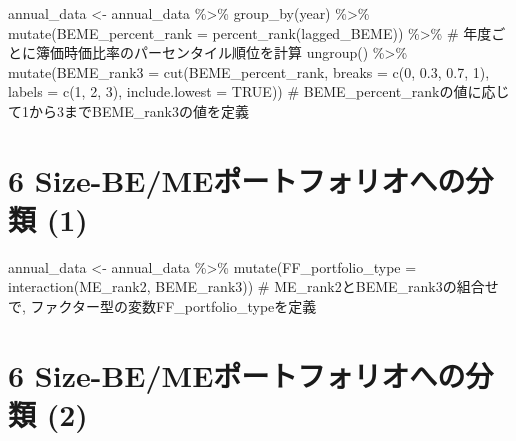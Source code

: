 \documentclass[
  letterpaper,
  DIV=11,
  numbers=noendperiod]{scrreprt}
\newenvironment{Shaded}{\begin{snugshade}}{\end{snugshade}}
\newcommand{\AttributeTok}[1]{\textcolor[rgb]{0.40,0.45,0.13}{#1}}
\newcommand{\CommentTok}[1]{\textcolor[rgb]{0.37,0.37,0.37}{#1}}
\newcommand{\ConstantTok}[1]{\textcolor[rgb]{0.56,0.35,0.01}{#1}}
\newcommand{\DecValTok}[1]{\textcolor[rgb]{0.68,0.00,0.00}{#1}}
\newcommand{\FloatTok}[1]{\textcolor[rgb]{0.68,0.00,0.00}{#1}}
\newcommand{\FunctionTok}[1]{\textcolor[rgb]{0.28,0.35,0.67}{#1}}
\newcommand{\NormalTok}[1]{\textcolor[rgb]{0.00,0.23,0.31}{#1}}
\newcommand{\OtherTok}[1]{\textcolor[rgb]{0.00,0.23,0.31}{#1}}
\newcommand{\SpecialCharTok}[1]{\textcolor[rgb]{0.37,0.37,0.37}{#1}}
\begin{document}
\begin{Shaded}
\begin{Highlighting}[]
\NormalTok{annual\_data }\OtherTok{\textless{}{-}}\NormalTok{ annual\_data }\SpecialCharTok{\%\textgreater{}\%}
  \FunctionTok{group\_by}\NormalTok{(year) }\SpecialCharTok{\%\textgreater{}\%} 
  \FunctionTok{mutate}\NormalTok{(}\AttributeTok{BEME\_percent\_rank =} \FunctionTok{percent\_rank}\NormalTok{(lagged\_BEME)) }\SpecialCharTok{\%\textgreater{}\%} \CommentTok{\# 年度ごとに簿価時価比率のパーセンタイル順位を計算}
  \FunctionTok{ungroup}\NormalTok{() }\SpecialCharTok{\%\textgreater{}\%}
  \FunctionTok{mutate}\NormalTok{(}\AttributeTok{BEME\_rank3 =} \FunctionTok{cut}\NormalTok{(BEME\_percent\_rank, }
                          \AttributeTok{breaks =} \FunctionTok{c}\NormalTok{(}\DecValTok{0}\NormalTok{, }\FloatTok{0.3}\NormalTok{, }\FloatTok{0.7}\NormalTok{, }\DecValTok{1}\NormalTok{), }
                          \AttributeTok{labels =} \FunctionTok{c}\NormalTok{(}\DecValTok{1}\NormalTok{, }\DecValTok{2}\NormalTok{, }\DecValTok{3}\NormalTok{),}
                          \AttributeTok{include.lowest =} \ConstantTok{TRUE}\NormalTok{)) }\CommentTok{\# BEME\_percent\_rankの値に応じて1から3までBEME\_rank3の値を定義}
\end{Highlighting}
\end{Shaded}

\section{6 Size-BE/MEポートフォリオへの分類
(1)}\label{size-bemeux30ddux30fcux30c8ux30d5ux30a9ux30eaux30aaux3078ux306eux5206ux985e-1}

\begin{Shaded}
\begin{Highlighting}[]
\NormalTok{annual\_data }\OtherTok{\textless{}{-}}\NormalTok{ annual\_data }\SpecialCharTok{\%\textgreater{}\%}
  \FunctionTok{mutate}\NormalTok{(}\AttributeTok{FF\_portfolio\_type =} \FunctionTok{interaction}\NormalTok{(ME\_rank2, BEME\_rank3)) }\CommentTok{\# ME\_rank2とBEME\_rank3の組合せで, ファクター型の変数FF\_portfolio\_typeを定義}
\end{Highlighting}
\end{Shaded}

\section{6 Size-BE/MEポートフォリオへの分類
(2)}\label{size-bemeux30ddux30fcux30c8ux30d5ux30a9ux30eaux30aaux3078ux306eux5206ux985e-2}
\end{document}
